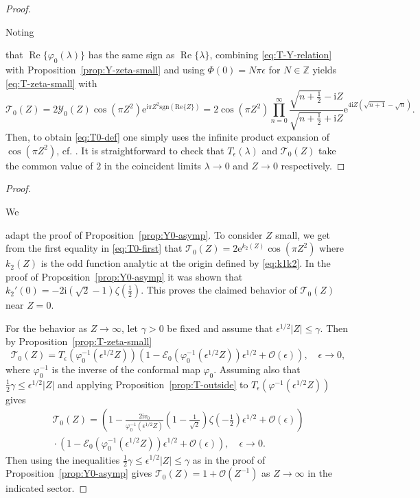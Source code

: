 \documentclass[12pt]{amsart}
\numberwithin{equation}{section}
\newcommand{\ee}{\mathrm{e}}
\newcommand{\ii}{\mathrm{i}}
\newcommand{\SP}{\lambda}
\newcommand{\phaseint}{\Phi}
\newcommand{\bigo}[1]{ \mathcal{O}\! \left( #1 \right) }
\DeclareMathOperator{\re}{Re}
\begin{document}
\TatZero*

\begin{proof}
\hypertarget{proof:TatZero}{Noting} that $\re\{\varphi_0(\SP)\}$ has the same sign as $\re\{\SP\}$,
combining \eqref{eq:T-Y-relation} with Proposition~\ref{prop:Y-zeta-small} and using $\phaseint(0)=N\pi\epsilon$ for $N\in\mathbb{Z}$ 
yields \eqref{eq:T-zeta-small} with
\begin{equation}
\mathcal{T}_0(Z)=2\mathcal{Y}_0(Z)\cos(\pi Z^2)\ee^{\ii\pi Z^2\mathrm{sgn}(\mathrm{Re}\{Z\})} = 2\cos(\pi Z^2)\prod_{n=0}^\infty\frac{\sqrt{n+\tfrac{1}{2}}-\ii Z}{\sqrt{n+\tfrac{1}{2}}+\ii Z}\ee^{4\ii Z(\sqrt{n+1}-\sqrt{n})}.
\label{eq:T0-first}
\end{equation}
Then, to obtain \eqref{eq:T0-def} one simply uses the infinite product expansion of $\cos(\pi Z^2)$, cf. \cite[Eq.~4.22.2]{DLMF}.  It is straightforward to check that $T_\epsilon(\SP)$ and $\mathcal{T}_0(Z)$ take the common value of $2$ in the coincident limits $\SP\to 0$ and $Z\to 0$ respectively.
\end{proof}

\TSmallLargeZ*

\begin{proof}
\hypertarget{proof:TSmallLargeZ}{We} adapt the proof of Proposition~\ref{prop:Y0-asymp}.  To consider $Z$ small, we get from the first equality in \eqref{eq:T0-first} that $\mathcal{T}_0(Z)=2\ee^{k_2(Z)}\cos(\pi Z^2)$ where $k_2(Z)$ is the odd function analytic at the origin defined by \eqref{eq:k1k2}.  In the proof of Proposition~\ref{prop:Y0-asymp} it was shown that $k_2'(0)=-2\ii (\sqrt{2}-1)\zeta(\tfrac{1}{2})$.  This proves the claimed behavior of $\mathcal{T}_0(Z)$ near $Z=0$.  

For the behavior as $Z\to\infty$, let $\gamma>0$ be fixed and assume that $\epsilon^{1/2}|Z|\le\gamma$.  Then by Proposition~\ref{prop:T-zeta-small}
\begin{equation}
\mathcal{T}_0(Z)=T_\epsilon(\varphi_0^{-1}(\epsilon^{1/2}Z))\left(1-\mathcal{E}_0(\varphi_0^{-1}(\epsilon^{1/2}Z))\epsilon^{1/2}+\bigo{\epsilon}\right),\quad\epsilon\to 0,
\end{equation}
where $\varphi_0^{-1}$ is the inverse of the conformal map $\varphi_0$.  Assuming also that $\tfrac{1}{2}\gamma\le\epsilon^{1/2} |Z|$ and applying Proposition~\ref{prop:T-outside} to $T_\epsilon(\varphi^{-1}(\epsilon^{1/2}Z))$ gives 
\begin{multline}
\mathcal{T}_0(Z)=\left(1-\frac{2\ii v_0}{\varphi_0^{-1}(\epsilon^{1/2}Z)}\left(1-\frac{1}{\sqrt{2}}\right)\zeta(-\tfrac{1}{2})\epsilon^{1/2}+\bigo{\epsilon}\right)\\
{}\cdot\left(1-\mathcal{E}_0(\varphi_0^{-1}(\epsilon^{1/2}Z))\epsilon^{1/2}+\bigo{\epsilon}\right),\quad\epsilon\to 0.
\end{multline}
Then using the inequalities $\tfrac{1}{2}\gamma\le\epsilon^{1/2}|Z|\le\gamma$ as in the proof of Proposition~\ref{prop:Y0-asymp} gives $\mathcal{T}_0(Z)=1+\bigo{Z^{-1}}$ as $Z\to\infty$ in the indicated sector.
\end{proof}
\end{document}
